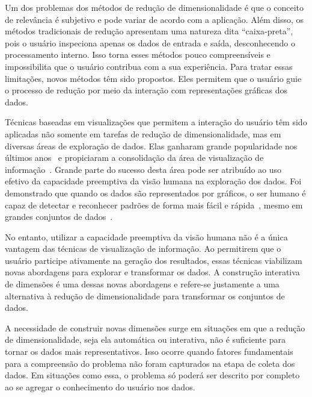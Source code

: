 Um dos problemas dos métodos de redução de dimensionalidade
é que o conceito de relevância é subjetivo e pode variar de
acordo com a aplicação. Além disso, os métodos tradicionais
de redução apresentam uma natureza dita ``caixa-preta'',
pois o usuário inspeciona apenas os dados de entrada e
saída, desconhecendo o processamento interno. Isso torna
esses métodos pouco compreensíveis e impossibilita que o
usuário contribua com a sua experiência. Para tratar
essas limitações, novos métodos têm sido propostos. Eles
permitem que o usuário guie o processo de redução por meio
da interação com representações gráficas dos dados.

Técnicas baseadas em visualizações que permitem a
interação do usuário têm sido aplicadas não somente em
tarefas de redução de dimensionalidade, mas em diversas
áreas de exploração de dados. Elas ganharam grande
popularidade nos últimos anos~\cite{State2012} e propiciaram
a consolidação da área de visualização de
informação~\cite{Keim2002}. Grande parte do sucesso desta
área pode ser atribuído ao uso efetivo da capacidade
preemptiva da visão humana na exploração dos dados. Foi
demonstrado que quando os dados são representados por 
gráficos, o ser humano é capaz de detectar e reconhecer
padrões de forma mais fácil e rápida~\cite{Healey1995},
mesmo em grandes conjuntos de dados~\cite{Fodor2002}. 

No entanto, utilizar a capacidade preemptiva da visão humana
não é a única vantagem das técnicas de visualização de
informação. Ao permitirem que o usuário participe ativamente
na geração dos resultados, essas técnicas viabilizam novas
abordagens para explorar e transformar os dados. A
construção interativa de dimensões é uma dessas novas
abordagens e refere-se justamente a uma alternativa à
redução de dimensionalidade para transformar os conjuntos
de dados.

A necessidade de construir novas dimensões surge em
situações em que a redução de dimensionalidade, seja ela
automática ou interativa, não é suficiente para tornar os
dados mais representativos. Isso ocorre quando fatores
fundamentais para a compreensão do problema não foram
capturados na etapa de coleta dos dados. Em situações como
essa, o problema só poderá ser descrito por completo ao se
agregar o conhecimento do usuário nos dados.

